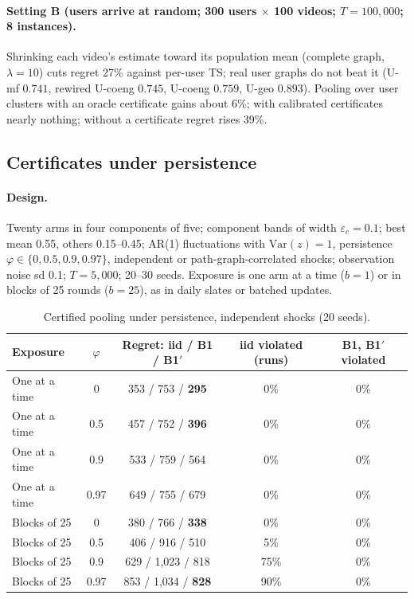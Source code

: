 \documentclass[11pt]{article}
\theoremstyle{definition}
\theoremstyle{remark}
\newcommand{\Var}{\mathrm{Var}}
\begin{document}
\paragraph{Setting B (users arrive at random; 300 users $\times$ 100 videos; $T=100{,}000$; 8 instances).} Shrinking each video's estimate toward its population mean (complete graph, $\lambda=10$) cuts regret 27\% against per-user TS; real user graphs do not beat it (U-mf $0.741$, rewired U-coeng $0.745$, U-coeng $0.759$, U-geo $0.893$). Pooling over user clusters with an oracle certificate gains about 6\%; with calibrated certificates nearly nothing; without a certificate regret rises 39\%.

\subsection{Certificates under persistence}\label{sec:exp-cert}

\paragraph{Design.} Twenty arms in four components of five; component bands of width $\varepsilon_c=0.1$; best mean 0.55, others 0.15--0.45; AR(1) fluctuations with $\Var(z)=1$, persistence $\varphi\in\{0,0.5,0.9,0.97\}$, independent or path-graph-correlated shocks; observation noise sd 0.1; $T=5{,}000$; 20--30 seeds. Exposure is one arm at a time ($b=1$) or in blocks of 25 rounds ($b=25$), as in daily slates or batched updates.

\begin{table}[t]\centering\small
\begin{tabular}{lcccc}
\toprule
Exposure & $\varphi$ & Regret: iid / B1 / B1$'$ & iid violated (runs) & B1, B1$'$ violated \\
\midrule
One at a time & 0 & 353 / 753 / \textbf{295} & 0\% & 0\% \\
One at a time & 0.5 & 457 / 752 / \textbf{396} & 0\% & 0\% \\
One at a time & 0.9 & 533 / 759 / 564 & 0\% & 0\% \\
One at a time & 0.97 & 649 / 755 / 679 & 0\% & 0\% \\
Blocks of 25 & 0 & 380 / 766 / \textbf{338} & 0\% & 0\% \\
Blocks of 25 & 0.5 & 406 / 916 / 510 & 5\% & 0\% \\
Blocks of 25 & 0.9 & 629 / 1,023 / 818 & 75\% & 0\% \\
Blocks of 25 & 0.97 & 853 / 1,034 / \textbf{828} & 90\% & 0\% \\
\bottomrule
\end{tabular}
\caption{Certified pooling under persistence, independent shocks (20 seeds).}\label{tab:b1p}
\end{table}
\end{document}
